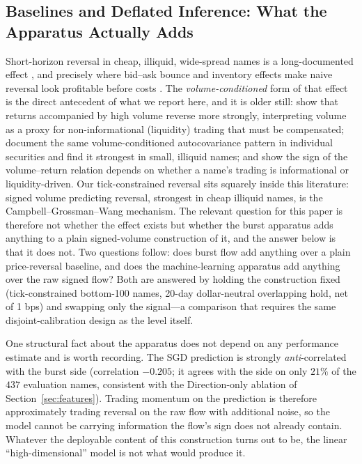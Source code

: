 \documentclass[11pt]{article}
\begin{document}
\subsection{Baselines and Deflated Inference: What the Apparatus Actually Adds}
\label{sec:baselines}
Short-horizon reversal in cheap, illiquid, wide-spread names is a long-documented effect \citep{jegadeesh1990,lehmann1990}, and precisely where bid--ask bounce and inventory effects make naive reversal look profitable before costs \citep{nagel2012}. The \emph{volume-conditioned} form of that effect is the direct antecedent of what we report here, and it is older still: \citet{campbell1993} show that returns accompanied by high volume reverse more strongly, interpreting volume as a proxy for non-informational (liquidity) trading that must be compensated; \citet{conrad1994} document the same volume-conditioned autocovariance pattern in individual securities and find it strongest in small, illiquid names; and \citet{llorente2002} show the sign of the volume--return relation depends on whether a name's trading is informational or liquidity-driven. Our tick-constrained reversal sits squarely inside this literature: signed volume predicting reversal, strongest in cheap illiquid names, is the Campbell--Grossman--Wang mechanism. The relevant question for this paper is therefore not whether the effect exists but whether the burst apparatus adds anything to a plain signed-volume construction of it, and the answer below is that it does not. Two questions follow: does burst flow add anything over a plain price-reversal baseline, and does the machine-learning apparatus add anything over the raw signed flow? Both are answered by holding the construction fixed (tick-constrained bottom-100 names, 20-day dollar-neutral overlapping hold, net of 1 bps) and swapping only the signal---a comparison that requires the same disjoint-calibration design as the level itself.





One structural fact about the apparatus does not depend on any performance estimate and is worth recording. The SGD prediction is strongly \emph{anti}-correlated with the burst side (correlation $-0.205$; it agrees with the side on only $21\%$ of the $437$ evaluation names, consistent with the Direction-only ablation of Section~\ref{sec:features}). Trading momentum on the prediction is therefore approximately trading reversal on the raw flow with additional noise, so the model cannot be carrying information the flow's sign does not already contain. Whatever the deployable content of this construction turns out to be, the linear ``high-dimensional'' model is not what would produce it.
\end{document}
